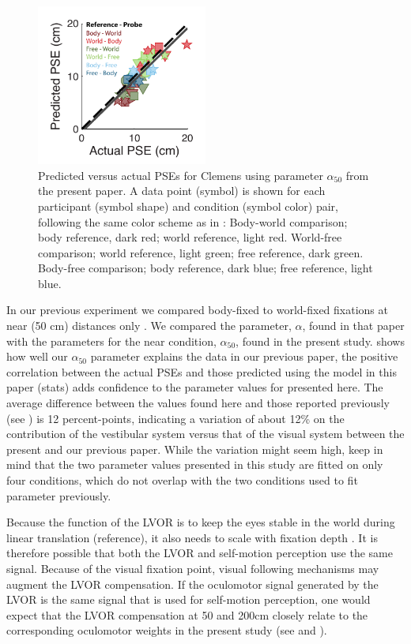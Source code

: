 \begin{figure}
    \includegraphics[width=0.5\textwidth]{src/paper4/p4_figure6.pdf}

    \caption{Predicted versus actual PSEs for Clemens \protect\citeyear{clemens2015a} using parameter $\alpha_{50}$ from the present paper. A data point (symbol) is shown for each participant (symbol shape) and condition (symbol color) pair, following the same color scheme as in \protect{}: Body-world comparison; body reference, dark red; world reference, light red. World-free comparison; world reference, light green; free reference, dark green. Body-free comparison; body reference, dark blue; free reference, light blue.}
    \label{p4:fig6}
\end{figure}

In our previous experiment we compared body-fixed to world-fixed fixations at near (50 \si{\centi\metre}) distances only \cite{clemens2015a}. We compared the parameter, $\alpha$, found in that paper with the parameters for the near condition, $\alpha_{50}$, found in the present study.  shows how well our $\alpha_{50}$ parameter explains the data in our previous paper, the positive correlation between the actual PSEs and those predicted using the model in this paper (stats) adds confidence to the parameter values for  presented here. The average difference between the values found here and those reported previously (see ) is 12  percent-points, indicating a variation of about 12\% on the contribution of the vestibular system versus that of the visual system between the present and our previous paper. While the variation might seem high, keep in mind that the two parameter values presented in this study are fitted on only four conditions, which do not overlap with the two conditions used to fit  parameter  previously.

Because the function of the LVOR is to keep the eyes stable in the world during linear translation (reference), it also needs to scale with fixation depth \cite{paige1989, busettini1994,paige1998}. It is therefore possible that both the LVOR and self-motion perception use the same signal. Because of the visual fixation point, visual following mechanisms may augment the LVOR compensation. If the oculomotor signal generated by the LVOR is the same signal that is used for self-motion perception, one would expect that the LVOR compensation at 50 and 200cm closely relate to the corresponding oculomotor weights in the present study (see  and ).


